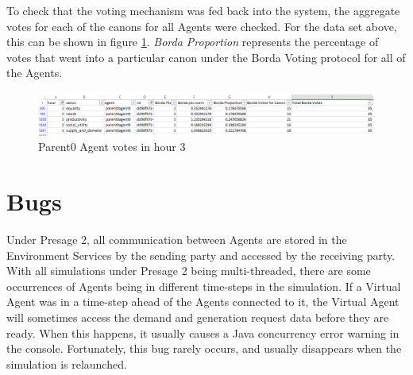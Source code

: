 To check that the voting mechanism was fed back into the system, the aggregate votes for each of the canons for all Agents were checked. For the data set above, this can be shown in figure \ref{fig:AgentVotes}. \textit{Borda Proportion} represents the percentage of votes that went into a particular canon under the Borda Voting protocol for all of the Agents.

\begin{figure}[h!]
	\centering
	\includegraphics[scale=0.34]{Images/test-allocation4.png}
	\caption{Parent0 Agent votes in hour 3}
	\label{fig:AgentVotes}
\end{figure}

\section*{Bugs}
Under Presage 2, all communication between Agents are stored in the Environment Services by the sending party and accessed by the receiving party. With all simulations under Presage 2 being multi-threaded, there are some occurrences of Agents being in different time-steps in the simulation. If a Virtual Agent was in a time-step ahead of the Agents connected to it, the Virtual Agent will sometimes access the demand and generation request data before they are ready. When this happens, it usually causes a Java concurrency error warning in the console. Fortunately, this bug rarely occurs, and usually disappears when the simulation is relaunched.

